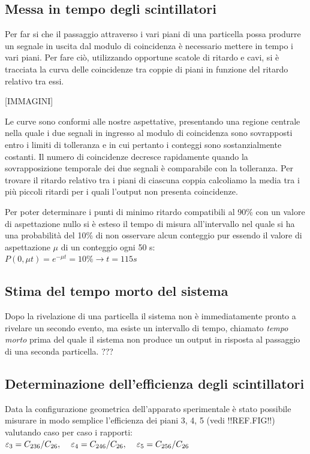 \documentclass[11pt]{article}
\begin{document}
\begin{flushleft}
\subsection{Messa in tempo degli scintillatori} \label{subsec:sync}

Per far si che il passaggio attraverso i vari piani di una particella possa produrre un segnale in uscita dal modulo di coincidenza è necessario mettere in tempo i vari piani. Per fare ciò, utilizzando opportune scatole di ritardo e cavi, si è tracciata la curva delle coincidenze tra coppie di piani in funzione del ritardo relativo tra essi.

[IMMAGINI]

Le curve sono conformi alle nostre aspettative, presentando una regione centrale nella quale i due segnali in ingresso al modulo di coincidenza sono sovrapposti entro i limiti di tolleranza e in cui pertanto i conteggi sono sostanzialmente costanti. 
Il numero di coincidenze decresce rapidamente quando la sovrapposizione temporale dei due segnali è comparabile con la tolleranza. Per trovare il ritardo relativo tra i piani di ciascuna coppia calcoliamo la media tra i più piccoli ritardi per i quali l'output non presenta coincidenze.

Per poter determinare i punti di minimo ritardo compatibili al 90\% con un valore di
aspettazione nullo si è esteso il tempo di misura all’intervallo nel quale si ha una probabilità del 10\% di non
osservare alcun conteggio pur essendo il valore di aspettazione $\mu$ di un conteggio ogni 50 s: \\

$
P(0, \mu t) = e^{−\mu t} = 10\% → t = 115 s
$

\subsection{Stima del tempo morto del sistema}
Dopo la rivelazione di una particella il sistema non è immediatamente pronto a rivelare un secondo evento, ma esiste un intervallo di tempo, chiamato \textit{tempo morto} prima del quale il sistema non produce un output in risposta al passaggio di una seconda particella. 
???
\subsection{Determinazione dell'efficienza degli scintillatori} \label{subsec:efficienza}
Data la configurazione geometrica dell'apparato sperimentale è stato possibile misurare in modo semplice l'efficienza dei piani 3, 4, 5 (vedi !!REF.FIG!!) valutando caso per caso i rapporti: \\
$
\varepsilon_3 = C_{236}/C_{26}, \hspace{0.4 cm} \varepsilon_4 = C_{246}/C_{26}, \hspace{0.4 cm} \varepsilon_5 = C_{256}/C_{26}
$


\end{flushleft}
\end{document}
